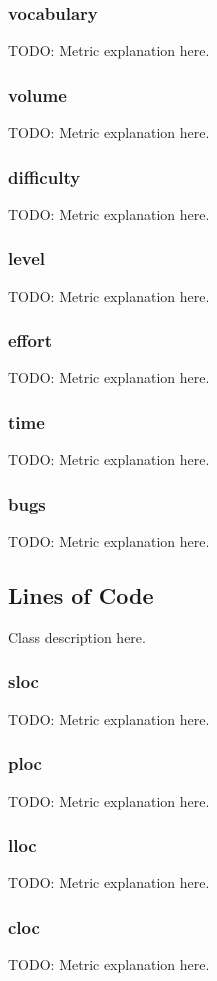 \subsubsection{vocabulary}
TODO: Metric explanation here.
\subsubsection{volume}
TODO: Metric explanation here.
\subsubsection{difficulty}
TODO: Metric explanation here.
\subsubsection{level}
TODO: Metric explanation here.
\subsubsection{effort}
TODO: Metric explanation here.
\subsubsection{time}
TODO: Metric explanation here.
\subsubsection{bugs}
TODO: Metric explanation here.
\subsection{Lines of Code}

Class description here.

\subsubsection{sloc}
TODO: Metric explanation here.
\subsubsection{ploc}
TODO: Metric explanation here.
\subsubsection{lloc}
TODO: Metric explanation here.
\subsubsection{cloc}
TODO: Metric explanation here.
